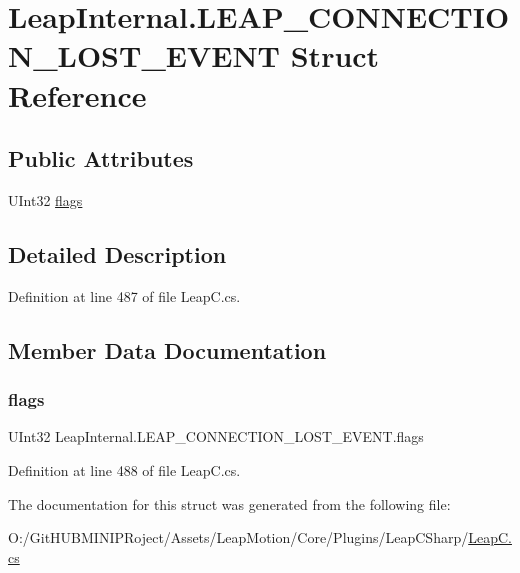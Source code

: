 \hypertarget{struct_leap_internal_1_1_l_e_a_p___c_o_n_n_e_c_t_i_o_n___l_o_s_t___e_v_e_n_t}{}\section{Leap\+Internal.\+L\+E\+A\+P\+\_\+\+C\+O\+N\+N\+E\+C\+T\+I\+O\+N\+\_\+\+L\+O\+S\+T\+\_\+\+E\+V\+E\+NT Struct Reference}
\label{struct_leap_internal_1_1_l_e_a_p___c_o_n_n_e_c_t_i_o_n___l_o_s_t___e_v_e_n_t}
\subsection*{Public Attributes}
\begin{DoxyCompactItemize}
\item 
U\+Int32 \mbox{\hyperlink{struct_leap_internal_1_1_l_e_a_p___c_o_n_n_e_c_t_i_o_n___l_o_s_t___e_v_e_n_t_a2a0455193c77badda3e3b664c028787b}{flags}}
\end{DoxyCompactItemize}


\subsection{Detailed Description}


Definition at line 487 of file Leap\+C.\+cs.



\subsection{Member Data Documentation}
\mbox{\label{struct_leap_internal_1_1_l_e_a_p___c_o_n_n_e_c_t_i_o_n___l_o_s_t___e_v_e_n_t_a2a0455193c77badda3e3b664c028787b}} 
\subsubsection{\texorpdfstring{flags}{flags}}
{\footnotesize\ttfamily U\+Int32 Leap\+Internal.\+L\+E\+A\+P\+\_\+\+C\+O\+N\+N\+E\+C\+T\+I\+O\+N\+\_\+\+L\+O\+S\+T\+\_\+\+E\+V\+E\+N\+T.\+flags}



Definition at line 488 of file Leap\+C.\+cs.



The documentation for this struct was generated from the following file\+:\begin{DoxyCompactItemize}
\item 
O\+:/\+Git\+H\+U\+B\+M\+I\+N\+I\+P\+Roject/\+Assets/\+Leap\+Motion/\+Core/\+Plugins/\+Leap\+C\+Sharp/\mbox{\hyperlink{_leap_c_8cs}{Leap\+C.\+cs}}\end{DoxyCompactItemize}
